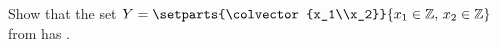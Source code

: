 Show that the set 
$Y=\setparts{\colvector{x_1\\x_2}}{x_1\in{\mathbb Z},\,x_2\in{\mathbb Z}}$
from  has .